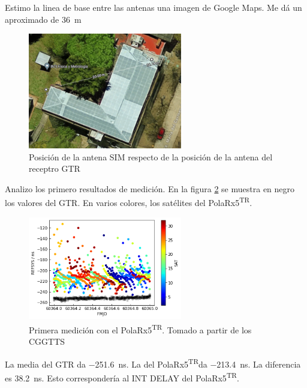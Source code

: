 \documentclass[11pt]{article}
\newcommand{\polar}[0]{PolaRx5\textsuperscript{TR}}
\begin{document}
Estimo la linea de base entre las antenas una imagen de Google Maps. Me dá un aproximado de \SI{36}{\meter}

\begin{figure}[ht]
    \begin{center}
        \includegraphics[width=0.6\textwidth]{./figuras/antenapos2.png}
        \caption{Posición de la antena SIM respecto de la posición de la antena del receptro GTR}
        \label{fig:antenapos2}
    \end{center}
\end{figure}

Analizo los primero resultados de medición. En la figura \ref{fig:medicionesMJD60364} se muestra en negro los valores del GTR. En varios colores, los satélites del \polar.


\begin{figure}[ht]
    \begin{center}
        \includegraphics[width=0.6\textwidth]{./figuras/medicionesMJD60364.png}
        \caption{Primera medición con el \polar. Tomado a partir de los CGGTTS}
        \label{fig:medicionesMJD60364}
    \end{center}
\end{figure}

La media del GTR da \SI{-251.6}{\nano\second}. La del \polar  da \SI{-213.4}{\nano\second}. La diferencia es \SI{38.2}{\nano\second}. Esto correspondería al INT DELAY del \polar.
\end{document}
